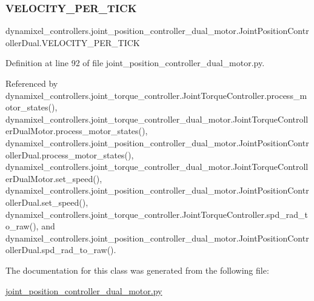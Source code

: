 \subsubsection{\texorpdfstring{V\+E\+L\+O\+C\+I\+T\+Y\+\_\+\+P\+E\+R\+\_\+\+T\+I\+CK}{VELOCITY\_PER\_TICK}}
{\footnotesize\ttfamily dynamixel\+\_\+controllers.\+joint\+\_\+position\+\_\+controller\+\_\+dual\+\_\+motor.\+Joint\+Position\+Controller\+Dual.\+V\+E\+L\+O\+C\+I\+T\+Y\+\_\+\+P\+E\+R\+\_\+\+T\+I\+CK}



Definition at line 92 of file joint\+\_\+position\+\_\+controller\+\_\+dual\+\_\+motor.\+py.



Referenced by dynamixel\+\_\+controllers.\+joint\+\_\+torque\+\_\+controller.\+Joint\+Torque\+Controller.\+process\+\_\+motor\+\_\+states(), dynamixel\+\_\+controllers.\+joint\+\_\+torque\+\_\+controller\+\_\+dual\+\_\+motor.\+Joint\+Torque\+Controller\+Dual\+Motor.\+process\+\_\+motor\+\_\+states(), dynamixel\+\_\+controllers.\+joint\+\_\+position\+\_\+controller\+\_\+dual\+\_\+motor.\+Joint\+Position\+Controller\+Dual.\+process\+\_\+motor\+\_\+states(), dynamixel\+\_\+controllers.\+joint\+\_\+torque\+\_\+controller\+\_\+dual\+\_\+motor.\+Joint\+Torque\+Controller\+Dual\+Motor.\+set\+\_\+speed(), dynamixel\+\_\+controllers.\+joint\+\_\+position\+\_\+controller\+\_\+dual\+\_\+motor.\+Joint\+Position\+Controller\+Dual.\+set\+\_\+speed(), dynamixel\+\_\+controllers.\+joint\+\_\+torque\+\_\+controller.\+Joint\+Torque\+Controller.\+spd\+\_\+rad\+\_\+to\+\_\+raw(), and dynamixel\+\_\+controllers.\+joint\+\_\+position\+\_\+controller\+\_\+dual\+\_\+motor.\+Joint\+Position\+Controller\+Dual.\+spd\+\_\+rad\+\_\+to\+\_\+raw().



The documentation for this class was generated from the following file\+:\begin{DoxyCompactItemize}
\item 
\hyperlink{joint__position__controller__dual__motor_8py}{joint\+\_\+position\+\_\+controller\+\_\+dual\+\_\+motor.\+py}\end{DoxyCompactItemize}
